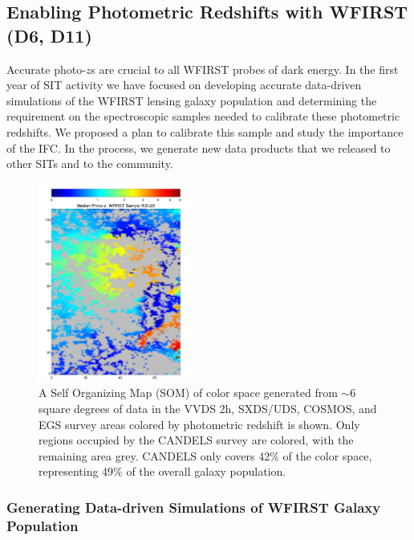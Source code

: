\subsection{Enabling Photometric Redshifts with WFIRST (D6, D11)}
\label{sec:wl_photoz}

\begin{summaryii}
Accurate photo-$z$s are crucial to all WFIRST probes of dark energy. In the
first year of SIT activity we have focused on developing accurate data-driven
simulations of the WFIRST lensing galaxy population and determining the
requirement on the spectroscopic samples needed to calibrate these photometric
redshifts. We proposed a plan to calibrate this sample and study the importance of the IFC. In the process, we generate new
data products that we released to other SITs and to the community.
\end{summaryii}

\begin{figure}
 \includegraphics[width=0.45\textwidth] {Plots/wfirst_color_dist.pdf}
\caption{A Self Organizing Map (SOM) \citep{Masters2015} of color space generated from $\sim6$ square degrees of data in the VVDS 2h, SXDS/UDS, COSMOS, and EGS survey areas colored by photometric redshift is shown.  Only regions occupied by the CANDELS survey are colored, with the remaining area grey.  CANDELS only covers 42\% of the color space, representing 49\% of the overall galaxy population.}
\label{fig:EuclidCandelsRep}
\end{figure}

\subsubsection{Generating Data-driven Simulations of WFIRST Galaxy Population}
\label{sec:candels}

